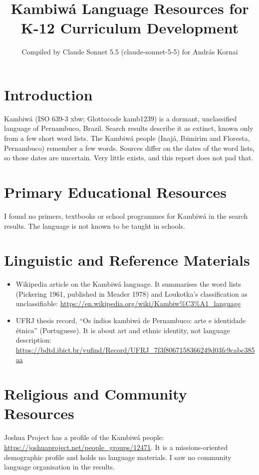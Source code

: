 \documentclass[12pt]{article}
\title{Kambiw\'a Language Resources for K-12 Curriculum Development}
\author{Compiled by Claude Sonnet 5.5 (claude-sonnet-5-5) for Andr\'as Kornai}
\date{}
\begin{document}
\maketitle

\section{Introduction}
Kambiw\'a (ISO 639-3 xbw; Glottocode kamb1239) is a dormant, unclassified language of Pernambuco, Brazil. Search results describe it as extinct, known only from a few short word lists. The Kambiw\'a people (Inaj\'a, Ibimirim and Floresta, Pernambuco) remember a few words. Sources differ on the dates of the word lists, so those dates are uncertain. Very little exists, and this report does not pad that.

\section{Primary Educational Resources}
I found no primers, textbooks or school programmes for Kambiw\'a in the search results. The language is not known to be taught in schools.

\section{Linguistic and Reference Materials}
\begin{itemize}
\item Wikipedia article on the Kambiw\'a language. It summarises the word lists (Pickering 1961, published in Meader 1978) and Loukotka's classification as unclassifiable: \url{https://en.wikipedia.org/wiki/Kambiw%C3%A1_language}
\item UFRJ thesis record, ``Os \'indios kambiw\'a de Pernambuco: arte e identidade \'etnica'' (Portuguese). It is about art and ethnic identity, not language description: \url{https://bdtd.ibict.br/vufind/Record/UFRJ_7f3f8067158366249d03fc9cabc385aa}
\end{itemize}

\section{Religious and Community Resources}
Joshua Project has a profile of the Kambiw\'a people: \url{https://joshuaproject.net/people_groups/12471}. It is a missions-oriented demographic profile and holds no language materials. I saw no community language organisation in the results.
\end{document}
